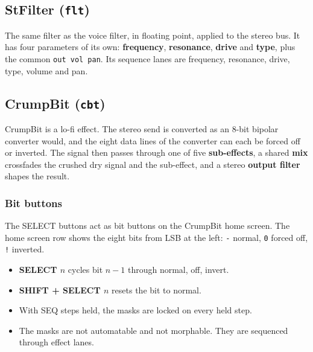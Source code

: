 \subsection{\texorpdfstring{StFilter
(\texttt{flt})}{StFilter (flt)}}\label{stfilter-flt}

The same filter as the voice filter, in floating point, applied to the
stereo bus. It has four parameters of its own: \textbf{frequency},
\textbf{resonance}, \textbf{drive} and \textbf{type}, plus the common
\texttt{out\ vol\ pan}. Its sequence lanes are frequency, resonance,
drive, type, volume and pan.


\subsection{\texorpdfstring{CrumpBit
(\texttt{cbt})}{CrumpBit (cbt)}}\label{crumpbit-cbt}

CrumpBit is a lo-fi effect. The stereo send is converted as an 8-bit
bipolar converter would, and the eight data lines of the converter can
each be forced off or inverted. The signal then passes through one of
five \textbf{sub-effects}, a shared \textbf{mix} crossfades the crushed
dry signal and the sub-effect, and a stereo \textbf{output filter}
shapes the result.

\subsubsection{Bit buttons}\label{bit-buttons}

The SELECT buttons act as bit buttons on the CrumpBit home screen. The
home screen row shows the eight bits from LSB at the left: \texttt{-}
normal, \texttt{0} forced off, \texttt{!} inverted.

\begin{itemize}
\tightlist
\item
  \textbf{SELECT \(n\)} cycles bit \(n-1\) through normal, off, invert.
\item
  \textbf{SHIFT + SELECT \(n\)} resets the bit to normal.
\item
  With SEQ steps held, the masks are locked on every held step.
\item
  The masks are not automatable and not morphable. They are sequenced
  through effect lanes.
\end{itemize}


